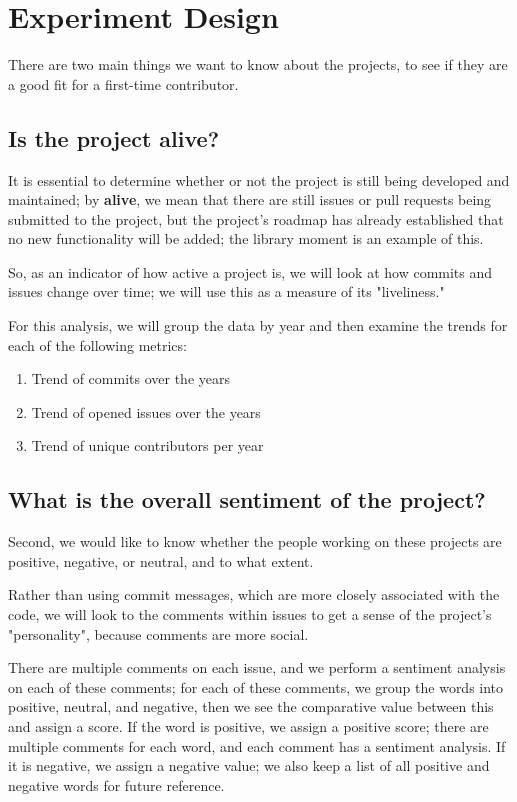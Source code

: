 \section{Experiment Design}
There are two main things we want to know about the projects, to see if they are a good fit for a first-time contributor.

\subsection{Is the project alive?}
It is essential to determine whether or not the project is still being developed and maintained; by \textbf{alive}, we mean that there are still issues or pull requests being submitted to the project, but the project's roadmap has already established that no new functionality will be added; the library moment \cite{moment} is an example of this.

So, as an indicator of how active a project is, we will look at how commits and issues change over time; we will use this as a measure of its "liveliness."

For this analysis, we will group the data by year and then examine the trends for each of the following metrics:
\begin{enumerate}
    \fontsize{10pt}{10pt}
    \selectfont
    \item Trend of commits over the years
    \item Trend of opened issues over the years
    \item Trend of unique contributors per year
\end{enumerate}

\subsection{What is the overall sentiment of the project?}
Second, we would like to know whether the people working on these projects are positive, negative, or neutral, and to what extent.

Rather than using commit messages, which are more closely associated with the code, we will look to the comments within issues to get a sense of the project's "personality", because comments are more social.

There are multiple comments on each issue, and we perform a sentiment analysis on each of these comments; for each of these comments, we group the words into positive, neutral, and negative, then we see the comparative value between this and assign a score. If the word is positive, we assign a positive score; there are multiple comments for each word, and each comment has a sentiment analysis. If it is negative, we assign a negative value; we also keep a list of all positive and negative words for future reference. 